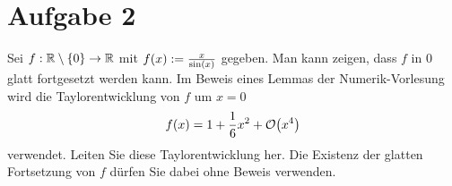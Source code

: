 \documentclass{exercise}
\begin{document}
    \section*{Aufgabe 2}

    \begin{problem}
        Sei \(f: \R \setminus \braces*{0} \to \R\) mit \(f\parentheses*{x} := \frac{x}{\sin\parentheses*{x}}\) gegeben.
        Man kann zeigen, dass \(f\) in \(0\) glatt fortgesetzt werden kann.
        Im Beweis eines Lemmas der Numerik-Vorlesung wird die Taylorentwicklung von \(f\) um \(x = 0\)
        \[
            f\parentheses*{x} = 1 + \frac{1}{6}x^2 + \mathcal{O}\parentheses*{x^4}
        \]
        verwendet.
        Leiten Sie diese Taylorentwicklung her.
        Die Existenz der glatten Fortsetzung von \(f\) dürfen Sie dabei ohne Beweis verwenden.
    \end{problem}
\end{document}
